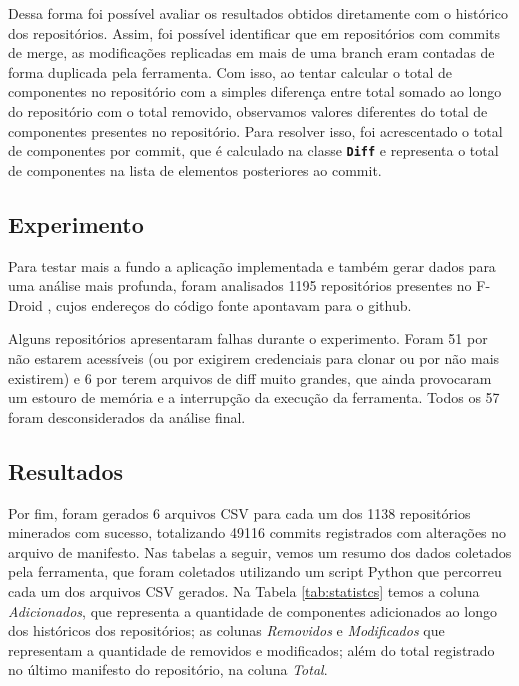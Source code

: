 \documentclass[a4paper,12pt]{article}
\begin{document}
{%

Dessa forma foi possível avaliar os resultados obtidos diretamente com o histórico dos repositórios. Assim, foi possível identificar que em repositórios com commits de merge, as modificações replicadas em mais de uma branch eram contadas de forma duplicada pela ferramenta. Com isso, ao tentar calcular o total de componentes no repositório com a simples diferença entre total somado ao longo do repositório com o total removido, observamos valores diferentes do total de componentes presentes no repositório.  Para resolver isso, foi acrescentado o total de componentes por commit, que é calculado na classe {\small\texttt{\textbf{Diff}}} e representa o total de componentes na lista de elementos posteriores ao commit.


\subsection{Experimento}%
\label{sec:experimentos}

Para testar mais a fundo a aplicação implementada e também gerar dados para uma análise  mais profunda, foram analisados 1195 repositórios presentes no F-Droid \cite{fdroid}, cujos endereços do código fonte apontavam para o github.

Alguns repositórios apresentaram falhas durante o experimento. Foram 51 por não estarem acessíveis (ou por exigirem credenciais para clonar ou por não mais existirem) e 6 por terem arquivos de diff muito grandes, que ainda provocaram um estouro de memória e a interrupção da execução da ferramenta. Todos os 57 foram desconsiderados da análise final. 


\subsection{Resultados}%
\label{sec:resultados}

Por fim, foram gerados 6 arquivos CSV para cada um dos 1138 repositórios minerados com sucesso, totalizando 49116 commits registrados com alterações no arquivo de manifesto. Nas tabelas a seguir, vemos um resumo dos dados coletados pela ferramenta,  que foram coletados utilizando um script Python que percorreu cada um dos arquivos CSV gerados. Na Tabela \ref{tab:statistcs} temos a coluna \textit{Adicionados}, que representa a quantidade de componentes adicionados ao longo dos históricos dos repositórios; as colunas \textit{Removidos} e \textit{Modificados} que representam a quantidade de removidos e modificados; além do total registrado no último manifesto do repositório, na coluna \textit{Total}.

}
\end{document}
